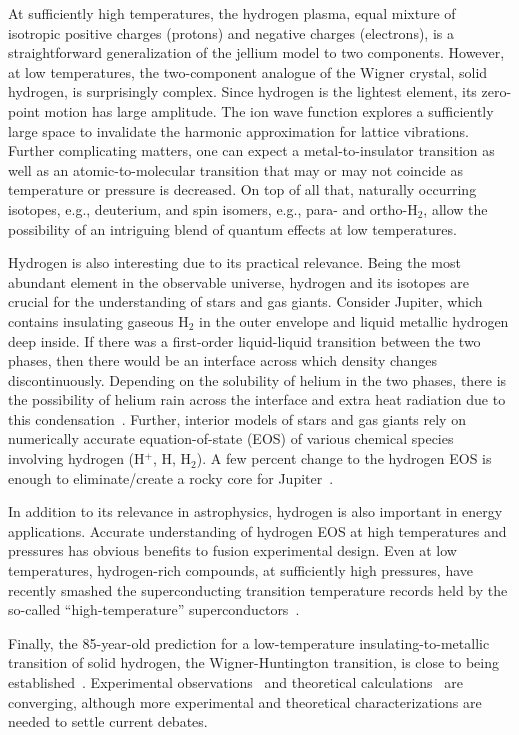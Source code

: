 At sufficiently high temperatures, the hydrogen plasma, equal mixture of isotropic positive charges (protons) and negative charges (electrons), is a straightforward generalization of the jellium model to two components. However, at low temperatures, the two-component analogue of the Wigner crystal, solid hydrogen, is surprisingly complex.
Since hydrogen is the lightest element, its zero-point motion has large amplitude. The ion wave function explores a sufficiently large space to invalidate the harmonic approximation for lattice vibrations.
Further complicating matters, one can expect a metal-to-insulator transition as well as an atomic-to-molecular transition that may or may not coincide as temperature or pressure is decreased.
On top of all that, naturally occurring isotopes, e.g., deuterium, and spin isomers, e.g., para- and ortho-H$_2$, allow the possibility of an intriguing blend of quantum effects at low temperatures.

Hydrogen is also interesting due to its practical relevance. Being the most abundant element in the observable universe, hydrogen and its isotopes are crucial for the understanding of stars and gas giants.
Consider Jupiter, which contains insulating gaseous H$_2$ in the outer envelope and liquid metallic hydrogen deep inside. If there was a first-order liquid-liquid transition between the two phases, then there would be an interface across which density changes discontinuously.
Depending on the solubility of helium in the two phases, there is the possibility of helium rain across the interface and extra heat radiation due to this condensation~\cite{Militzer_thesis}.
Further, interior models of stars and gas giants rely on numerically accurate equation-of-state (EOS) of various chemical species involving hydrogen (H$^+$, H, H$_2$).
A few percent change to the hydrogen EOS is enough to eliminate/create a rocky core for Jupiter~\cite{Hubbard2016}.

In addition to its relevance in astrophysics, hydrogen is also important in energy applications. Accurate understanding of hydrogen EOS at high temperatures and pressures has obvious benefits to fusion experimental design.
Even at low temperatures, hydrogen-rich compounds, at sufficiently high pressures, have recently smashed the superconducting transition temperature records held by the so-called ``high-temperature'' superconductors~\cite{Drozdov2015,Errea2020}.

Finally, the 85-year-old prediction for a low-temperature insulating-to-metallic transition of solid hydrogen, the Wigner-Huntington transition, is close to being established~\cite{Wigner1935,Dias2016,Loubeyre2020}.
Experimental observations~\cite{Dias2016,Loubeyre2020} and theoretical calculations~\cite{McMinis2015,Gorelov2019} are converging, although more experimental and theoretical characterizations are needed to settle current debates.

